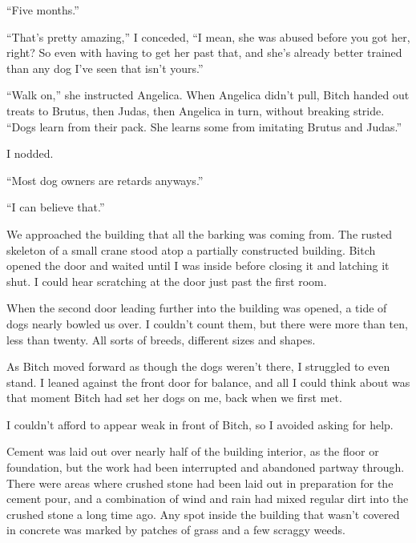 ``Five months.''



``That's pretty amazing,'' I conceded, ``I mean, she was abused before you got her, right?  So even with having to get her past that, and she's already better trained than any dog I've seen that isn't yours.''



``Walk on,'' she instructed Angelica.  When Angelica didn't pull, Bitch handed out treats to Brutus, then Judas, then Angelica in turn, without breaking stride.  ``Dogs learn from their pack.  She learns some from imitating Brutus and Judas.''



I nodded.



``Most dog owners are retards anyways.''



``I can believe that.''



We approached the building that all the barking was coming from.  The rusted skeleton of a small crane stood atop a partially constructed building.  Bitch opened the door and waited until I was inside before closing it and latching it shut.  I could hear scratching at the door just past the first room.



When the second door leading further into the building was opened, a tide of dogs nearly bowled us over. I couldn't count them, but there were more than ten, less than twenty.  All sorts of breeds, different sizes and shapes.



As Bitch moved forward as though the dogs weren't there, I struggled to even stand.  I leaned against the front door for balance, and all I could think about was that moment Bitch had set her dogs on me, back when we first met.



I couldn't afford to appear weak in front of Bitch, so I avoided asking for help.



Cement was laid out over nearly half of the building interior, as the floor or foundation, but the work had been interrupted and abandoned partway through.  There were areas where crushed stone had been laid out in preparation for the cement pour, and a combination of wind and rain had mixed regular dirt into the crushed stone a long time ago.  Any spot inside the building that wasn't covered in concrete was marked by patches of grass and a few scraggy weeds.



